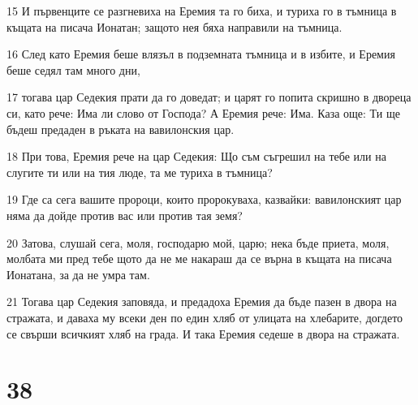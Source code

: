 \par 15 И първенците се разгневиха на Еремия та го биха, и туриха го в тъмница в къщата на писача Ионатан; защото нея бяха направили на тъмница.
\par 16 След като Еремия беше влязъл в подземната тъмница и в избите, и Еремия беше седял там много дни,
\par 17 тогава цар Седекия прати да го доведат; и царят го попита скришно в двореца си, като рече: Има ли слово от Господа? А Еремия рече: Има. Каза още: Ти ще бъдеш предаден в ръката на вавилонския цар.
\par 18 При това, Еремия рече на цар Седекия: Що съм съгрешил на тебе или на слугите ти или на тия люде, та ме туриха в тъмница?
\par 19 Где са сега вашите пророци, които пророкуваха, казвайки: вавилонският цар няма да дойде против вас или против тая земя?
\par 20 Затова, слушай сега, моля, господарю мой, царю; нека бъде приета, моля, молбата ми пред тебе щото да не ме накараш да се върна в къщата на писача Ионатана, за да не умра там.
\par 21 Тогава цар Седекия заповяда, и предадоха Еремия да бъде пазен в двора на стражата, и даваха му всеки ден по един хляб от улицата на хлебарите, догдето се свърши всичкият хляб на града. И така Еремия седеше в двора на стражата.

\chapter{38}

